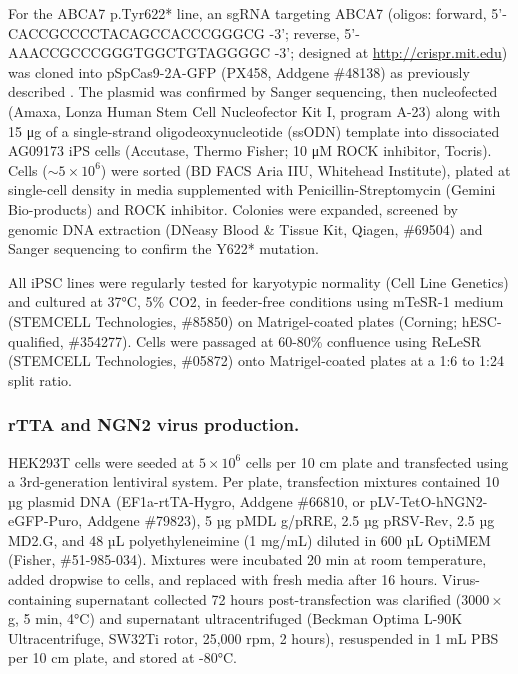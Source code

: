 For the ABCA7 p.Tyr622* line, an sgRNA targeting ABCA7 (oligos: forward, 5’- CACCGCCCCTACAGCCACCCGGGCG -3’; reverse, 5’- AAACCGCCCGGGTGGCTGTAGGGGC -3’; designed at \url{http://crispr.mit.edu}) was cloned into pSpCas9-2A-GFP (PX458, Addgene \#48138) as previously described \supercite{Ran2013-sf}. The plasmid was confirmed by Sanger sequencing, then nucleofected (Amaxa, Lonza Human Stem Cell Nucleofector Kit I, program A-23) along with 15 μg of a single-strand oligodeoxynucleotide (ssODN) template  into dissociated AG09173 iPS cells (Accutase, Thermo Fisher; 10 μM ROCK inhibitor, Tocris). Cells ($\sim 5 \times 10^6$) were sorted (BD FACS Aria IIU, Whitehead Institute), plated at single-cell density in media supplemented with Penicillin-Streptomycin (Gemini Bio-products) and ROCK inhibitor. Colonies were expanded, screened by genomic DNA extraction (DNeasy Blood & Tissue Kit, Qiagen, \#69504) and Sanger sequencing to confirm the Y622* mutation.

All iPSC lines were regularly tested for karyotypic normality (Cell Line Genetics) and cultured at 37°C, 5\% CO2, in feeder-free conditions using mTeSR-1 medium (STEMCELL Technologies, \#85850) on Matrigel-coated plates (Corning; hESC-qualified, \#354277). Cells were passaged at 60-80\% confluence using ReLeSR (STEMCELL Technologies, \#05872) onto Matrigel-coated plates at a 1:6 to 1:24 split ratio.

\subsubsection{rTTA and NGN2 virus production.}
HEK293T cells were seeded at $5 \times 10^6$ cells per 10 cm plate and transfected using a 3rd-generation lentiviral system. Per plate, transfection mixtures contained 10 µg plasmid DNA (EF1a-rtTA-Hygro, Addgene \#66810, or pLV-TetO-hNGN2-eGFP-Puro, Addgene \#79823), 5 µg pMDL g/pRRE, 2.5 µg pRSV-Rev, 2.5 µg MD2.G, and 48 µL polyethyleneimine (1 mg/mL) diluted in 600 µL OptiMEM (Fisher, \#51-985-034). Mixtures were incubated 20 min at room temperature, added dropwise to cells, and replaced with fresh media after 16 hours. Virus-containing supernatant collected 72 hours post-transfection was clarified ($3000 \times $g, 5 min, 4°C) and supernatant ultracentrifuged (Beckman Optima L-90K Ultracentrifuge, SW32Ti rotor, 25,000 rpm, 2 hours), resuspended in 1 mL PBS per 10 cm plate, and stored at -80°C.

